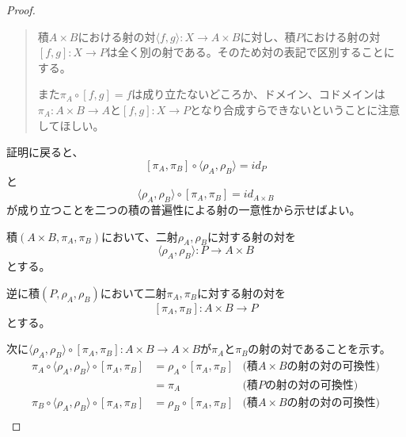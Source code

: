\documentclass[dvipdfmx]{jsarticle}
\newcommand{\arrow}{\rightarrow}
\newcommand{\tuple}[1]{\langle #1\rangle}
\newcommand{\mor}[3]{#1:#2\arrow #3}
\newtheorem{proof}{証明}[section]
\numberwithin{proof}{subsection}
\numberwithin{prop}{subsection}
\numberwithin{define}{subsection}
\begin{document}
\begin{proof}
\begin{quote}
			積$A\times B$における射の対$\mor{\tuple{f,g}}{X}{A\times B}$に対し、積$P$における射の対$\mor{[f,g]}{X}{P}$は全く別の射である。そのため対の表記で区別することにする。

			また$\pi_A\circ[f,g]=f$は成り立たないどころか、ドメイン、コドメインは$\mor{\pi_A}{A\times B}{A}$と$\mor{[f,g]}{X}{P}$となり合成すらできないということに注意してほしい。
		\end{quote}
		証明に戻ると、\[[\pi_A,\pi_B]\circ\tuple{\rho_A,\rho_B}=id_P\]と
		\[\tuple{\rho_A,\rho_B}\circ[\pi_A,\pi_B]=id_{A\times B}\]が成り立つことを二つの積の普遍性による射の一意性から示せばよい。

		積$(A\times B,\pi_A,\pi_B)$において、二射$\rho_A,\rho_B$に対する射の対を\[\mor{\tuple{\rho_A,\rho_B}}{P}{A\times B}\]とする。

		逆に積$(P,\rho_A,\rho_B)$において二射$\pi_A,\pi_B$に対する射の対を\[\mor{[\pi_A,\pi_B]}{A\times B}{P}\]とする。
		\begin{center}
		\end{center}
		次に$\mor{\tuple{\rho_A,\rho_B}\circ[\pi_A,\pi_B]}{A\times B}{A\times B}$が$\pi_A$と$\pi_B$の射の対であることを示す。
		\begin{align*}
			\pi_A\circ\tuple{\rho_A,\rho_B}\circ[\pi_A,\pi_B]&=\rho_A\circ[\pi_A,\pi_B]&\text{(積$A\times B$の射の対の可換性)}\\
			&=\pi_A&\text{(積$P$の射の対の可換性)}\\
			\pi_B\circ\tuple{\rho_A,\rho_B}\circ[\pi_A,\pi_B]&=\rho_B\circ[\pi_A,\pi_B]&\text{(積$A\times B$の射の対の可換性)}\\

\end{align*}
\end{proof}
\end{document}

